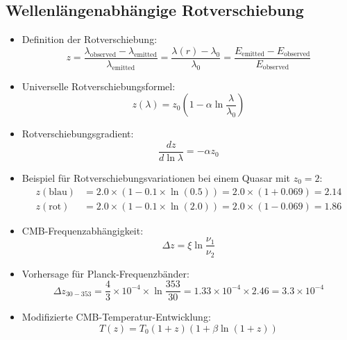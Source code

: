 \documentclass[12pt,a4paper]{article}
\begin{document}
	\subsection{Wellenlängenabhängige Rotverschiebung}
	\begin{itemize}
		\item Definition der Rotverschiebung:
		\begin{equation}
			z = \frac{\lambda_{\text{observed}} - \lambda_{\text{emitted}}}{\lambda_{\text{emitted}}} = \frac{\lambda(r) - \lambda_0}{\lambda_0} = \frac{E_{\text{emitted}} - E_{\text{observed}}}{E_{\text{observed}}}
		\end{equation}
		
		\item Universelle Rotverschiebungsformel:
		\begin{equation}
			\boxed{z(\lambda) = z_0\left(1 - \alpha \ln\frac{\lambda}{\lambda_0}\right)}
		\end{equation}
		
		\item Rotverschiebungsgradient:
		\begin{equation}
			\frac{dz}{d\ln\lambda} = -\alpha z_0
		\end{equation}
		
		\item Beispiel für Rotverschiebungsvariationen bei einem Quasar mit $z_0 = 2$:
		\begin{align}
			z(\text{blau}) &= 2.0 \times (1 - 0.1 \times \ln(0.5)) = 2.0 \times (1 + 0.069) = 2.14 \\
			z(\text{rot}) &= 2.0 \times (1 - 0.1 \times \ln(2.0)) = 2.0 \times (1 - 0.069) = 1.86
		\end{align}
		
		\item CMB-Frequenzabhängigkeit:
		\begin{equation}
			\Delta z = \xi \ln\frac{\nu_1}{\nu_2}
		\end{equation}
		
		\item Vorhersage für Planck-Frequenzbänder:
		\begin{equation}
			\Delta z_{30-353} = \frac{4}{3} \times 10^{-4} \times \ln\frac{353}{30} = 1.33 \times 10^{-4} \times 2.46 = 3.3 \times 10^{-4}
		\end{equation}
		
		\item Modifizierte CMB-Temperatur-Entwicklung:
		\begin{equation}
			\boxed{T(z) = T_0(1+z)\left(1 + \beta \ln(1+z)\right)}
		\end{equation}
	\end{itemize}
	
\end{document}
